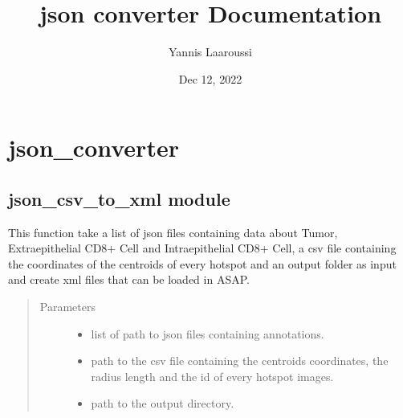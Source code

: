 \documentclass[letterpaper,10pt,english]{sphinxmanual}
\title{json converter Documentation}
\date{Dec 12, 2022}
\author{Yannis Laaroussi}
\begin{document}
\pagestyle{empty}
\sphinxmaketitle
\pagestyle{plain}
\sphinxtableofcontents
\pagestyle{normal}
\label{\detokenize{index::doc}}



\chapter{json\_converter}
\label{\detokenize{modules:json-converter}}\label{\detokenize{modules::doc}}

\section{json\_csv\_to\_xml module}
\label{\detokenize{json_csv_to_xml:module-json_csv_to_xml}}\label{\detokenize{json_csv_to_xml:json-csv-to-xml-module}}\label{\detokenize{json_csv_to_xml::doc}}

\begin{fulllineitems}
\label{\detokenize{json_csv_to_xml:json_csv_to_xml.convert_json_csv_to_xml}}
\sphinxAtStartPar
This function take a list of json files containing data about Tumor, Extraepithelial CD8+ Cell and
Intraepithelial CD8+ Cell, a csv file containing the coordinates of the centroids of every hotspot
and an output folder as input and create xml files that can be loaded in ASAP.
\begin{quote}\begin{description}
\item[{Parameters}] \leavevmode\begin{itemize}
\item {} 
\sphinxAtStartPar
{} \textendash{} list of path to json files containing annotations.

\item {} 
\sphinxAtStartPar
{} \textendash{} path to the csv file containing the centroids coordinates, the radius length and the id of every hotspot images.

\item {} 
\sphinxAtStartPar
{} \textendash{} path to the output directory.

\end{itemize}

\end{description}\end{quote}

\end{fulllineitems}
\end{document}
